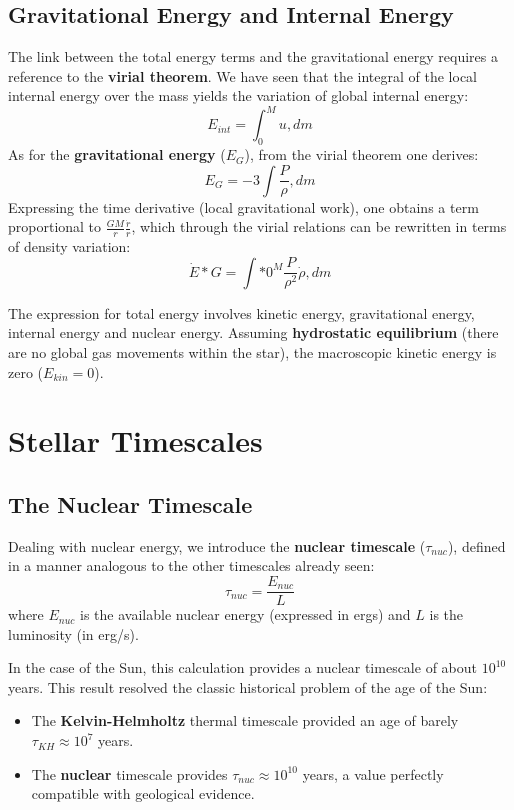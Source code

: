 \subsection{Gravitational Energy and Internal Energy}

The link between the total energy terms and the gravitational energy requires a reference to the \textbf{virial theorem}. We have seen that the integral of the local internal energy over the mass yields the variation of global internal energy:
\begin{equation}
E_{int} = \int_{0}^{M} u , dm
\end{equation}
As for the \textbf{gravitational energy} ($E_G$), from the virial theorem one derives:
\begin{equation}
E_G = -3 \int \frac{P}{\rho} , dm
\end{equation}
Expressing the time derivative (local gravitational work), one obtains a term proportional to $\frac{GM}{r} \frac{\dot{r}}{r}$, which through the virial relations can be rewritten in terms of density variation:
\begin{equation}
\dot{E}*G = \int*{0}^{M} \frac{P}{\rho^2} \dot{\rho} , dm
\end{equation}

The expression for total energy involves kinetic energy, gravitational energy, internal energy and nuclear energy. Assuming \textbf{hydrostatic equilibrium} (there are no global gas movements within the star), the macroscopic kinetic energy is zero ($E_{kin} = 0$).

\section{Stellar Timescales}

\subsection{The Nuclear Timescale}
Dealing with nuclear energy, we introduce the \textbf{nuclear timescale} ($\tau_{nuc}$), defined in a manner analogous to the other timescales already seen:
\begin{equation}
\tau_{nuc} = \frac{E_{nuc}}{L}
\end{equation}
where $E_{nuc}$ is the available nuclear energy (expressed in ergs) and $L$ is the luminosity (in erg/s).

In the case of the Sun, this calculation provides a nuclear timescale of about $10^{10}$ years. This result resolved the classic historical problem of the age of the Sun:
\begin{itemize}
\item The \textbf{Kelvin-Helmholtz} thermal timescale provided an age of barely $\tau_{KH} \approx 10^7$ years.
\item The \textbf{nuclear} timescale provides $\tau_{nuc} \approx 10^{10}$ years, a value perfectly compatible with geological evidence.
\end{itemize}

